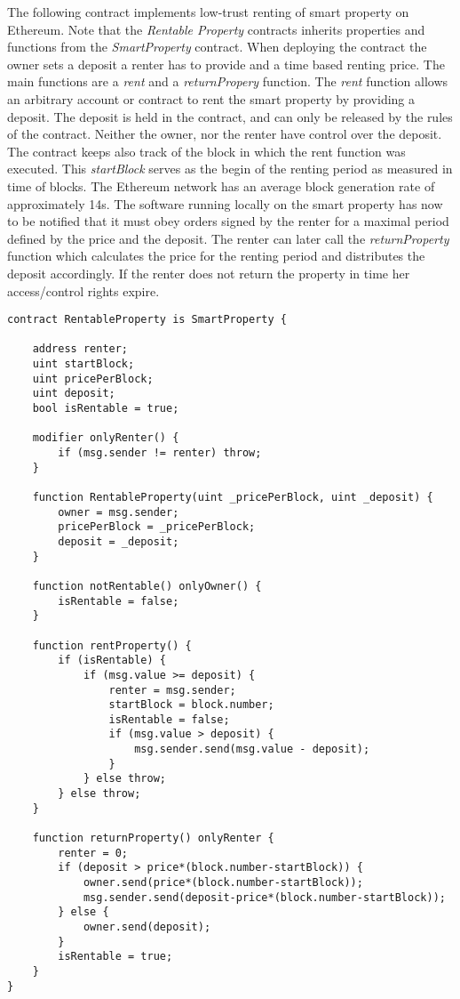 The following contract implements low-trust renting of smart property on Ethereum. Note that the \emph{Rentable Property} contracts inherits properties and functions from the \emph{SmartProperty} contract. When deploying the contract the owner sets a deposit a renter has to provide and a time based renting price. The main functions are a \emph{rent} and a \emph{returnPropery} function. The \emph{rent} function allows an arbitrary account or contract to rent the smart property by providing a deposit. The deposit is held in the contract, and can only be released by the rules of the contract. Neither the owner, nor the renter have control over the deposit. The contract keeps also track of the block in which the rent function was executed. This \emph{startBlock} serves as the begin of the renting period as measured in time of blocks. The Ethereum network has an average block generation rate of approximately 14s. 
The software running locally on the smart property has now to be notified that it must obey orders signed by the renter for a maximal period defined by the price and the deposit. 
The renter can later call the \emph{returnProperty} function which calculates the price for the renting period and distributes the deposit accordingly. If the renter does not return the property in time her access/control rights expire. 

\begin{lstlisting}[breaklines,basicstyle=\tiny]
contract RentableProperty is SmartProperty {
    
    address renter;
    uint startBlock;
    uint pricePerBlock;
    uint deposit;
    bool isRentable = true;
    
    modifier onlyRenter() {
        if (msg.sender != renter) throw;
    } 
    
    function RentableProperty(uint _pricePerBlock, uint _deposit) {
        owner = msg.sender;
        pricePerBlock = _pricePerBlock;
        deposit = _deposit;
    }
    
    function notRentable() onlyOwner() {
        isRentable = false;
    }
    
    function rentProperty() {
        if (isRentable) {
            if (msg.value >= deposit) {
                renter = msg.sender;
                startBlock = block.number;
                isRentable = false;
                if (msg.value > deposit) {
                    msg.sender.send(msg.value - deposit);
                }
            } else throw;
        } else throw;
    }
    
    function returnProperty() onlyRenter {
        renter = 0;
        if (deposit > price*(block.number-startBlock)) {
            owner.send(price*(block.number-startBlock));
            msg.sender.send(deposit-price*(block.number-startBlock));
        } else {
            owner.send(deposit);
        }
        isRentable = true;
    }
}
\end{lstlisting}

